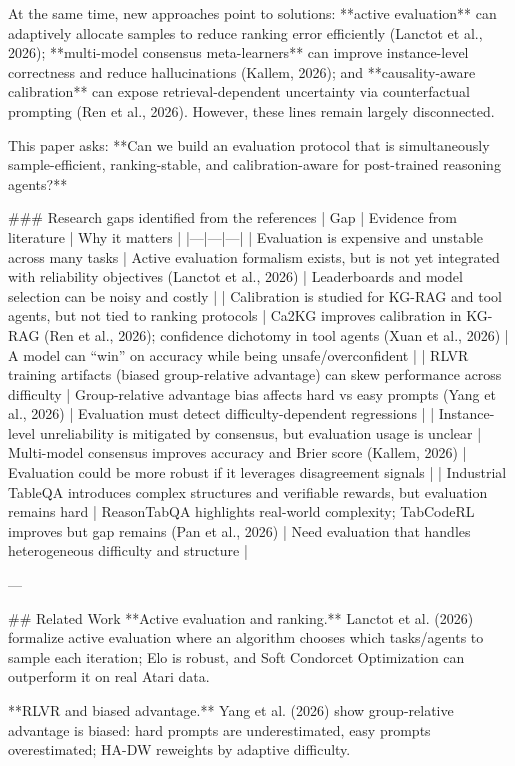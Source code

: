 At the same time, new approaches point to solutions: **active evaluation** can adaptively allocate samples to reduce ranking error efficiently (Lanctot et al., 2026); **multi-model consensus meta-learners** can improve instance-level correctness and reduce hallucinations (Kallem, 2026); and **causality-aware calibration** can expose retrieval-dependent uncertainty via counterfactual prompting (Ren et al., 2026). However, these lines remain largely disconnected.

This paper asks: **Can we build an evaluation protocol that is simultaneously sample-efficient, ranking-stable, and calibration-aware for post-trained reasoning agents?**

### Research gaps identified from the references
| Gap | Evidence from literature | Why it matters |
|---|---|---|
| Evaluation is expensive and unstable across many tasks | Active evaluation formalism exists, but is not yet integrated with reliability objectives (Lanctot et al., 2026) | Leaderboards and model selection can be noisy and costly |
| Calibration is studied for KG-RAG and tool agents, but not tied to ranking protocols | Ca2KG improves calibration in KG-RAG (Ren et al., 2026); confidence dichotomy in tool agents (Xuan et al., 2026) | A model can “win” on accuracy while being unsafe/overconfident |
| RLVR training artifacts (biased group-relative advantage) can skew performance across difficulty | Group-relative advantage bias affects hard vs easy prompts (Yang et al., 2026) | Evaluation must detect difficulty-dependent regressions |
| Instance-level unreliability is mitigated by consensus, but evaluation usage is unclear | Multi-model consensus improves accuracy and Brier score (Kallem, 2026) | Evaluation could be more robust if it leverages disagreement signals |
| Industrial TableQA introduces complex structures and verifiable rewards, but evaluation remains hard | ReasonTabQA highlights real-world complexity; TabCodeRL improves but gap remains (Pan et al., 2026) | Need evaluation that handles heterogeneous difficulty and structure |

---

## Related Work
**Active evaluation and ranking.** Lanctot et al. (2026) formalize active evaluation where an algorithm chooses which tasks/agents to sample each iteration; Elo is robust, and Soft Condorcet Optimization can outperform it on real Atari data.

**RLVR and biased advantage.** Yang et al. (2026) show group-relative advantage is biased: hard prompts are underestimated, easy prompts overestimated; HA-DW reweights by adaptive difficulty.

